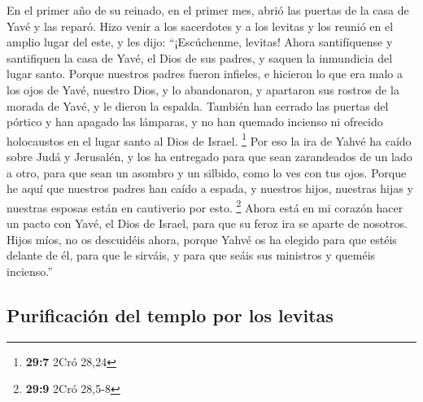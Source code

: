  En el primer año de su reinado, en el primer mes, abrió
las puertas de la casa de Yavé y las reparó.  Hizo venir a
los sacerdotes y a los levitas y los reunió en el amplio lugar del este,
 y les dijo: ``¡Escúchenme, levitas! Ahora santifíquense y
santifiquen la casa de Yavé, el Dios de sus padres, y saquen la
inmundicia del lugar santo.  Porque nuestros padres fueron
infieles, e hicieron lo que era malo a los ojos de Yavé, nuestro Dios, y
lo abandonaron, y apartaron sus rostros de la morada de Yavé, y le
dieron la espalda.  También han cerrado las puertas del
pórtico y han apagado las lámparas, y no han quemado incienso ni
ofrecido holocaustos en el lugar santo al Dios de Israel. \footnote{\textbf{29:7}
  2Cró 28,24}  Por eso la ira de Yahvé ha caído sobre Judá
y Jerusalén, y los ha entregado para que sean zarandeados de un lado a
otro, para que sean un asombro y un silbido, como lo ves con tus ojos.
 Porque he aquí que nuestros padres han caído a espada, y
nuestros hijos, nuestras hijas y nuestras esposas están en cautiverio
por esto. \footnote{\textbf{29:9} 2Cró 28,5-8}  Ahora
está en mi corazón hacer un pacto con Yavé, el Dios de Israel, para que
su feroz ira se aparte de nosotros.  Hijos míos, no os
descuidéis ahora, porque Yahvé os ha elegido para que estéis delante de
él, para que le sirváis, y para que seáis sus ministros y queméis
incienso.''

\hypertarget{purificaciuxf3n-del-templo-por-los-levitas}{%
\subsection{Purificación del templo por los
levitas}\label{purificaciuxf3n-del-templo-por-los-levitas}}

